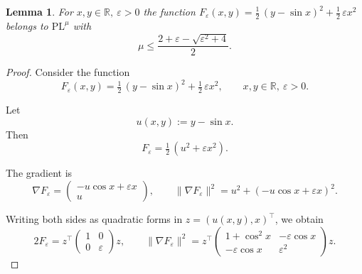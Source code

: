 \documentclass{article}
\def\R{{\mathbb{R}}}
\def\pl{{\text{PL}^\mu}}
\theoremstyle{plain}
\newtheorem{lemma}[theorem]{Lemma}
\theoremstyle{definition}
\theoremstyle{remark}
\begin{document}
\begin{lemma}\label{lem:toy_example_pl}
    For $x,y\in\R,\ \varepsilon>0$ the function $F_{\varepsilon}(x,y)=\tfrac12\,(y-\sin x)^2+\tfrac12\,\varepsilon x^2$ belongs to $\pl$ with
  $$\mu \le \frac{2+\varepsilon
-\sqrt{\varepsilon^2+4}}{2}.$$

\end{lemma}
\begin{proof}
    Consider the function
\[
F_{\varepsilon}(x,y)=\tfrac12\,(y-\sin x)^2+\tfrac12\,\varepsilon x^2,
\qquad x,y\in\R,\ \varepsilon>0.
\]

Let
\[
u(x,y) := y - \sin x.
\]
Then
\[
F_{\varepsilon}=\tfrac12\,(u^2+\varepsilon x^2).
\]

The gradient is
\[
\nabla F_{\varepsilon}=
\begin{pmatrix}
-u\cos x + \varepsilon x\\[3pt]
u
\end{pmatrix},
\qquad
\|\nabla F_{\varepsilon}\|^2 = u^2 + (-u\cos x + \varepsilon x)^2.
\]


Writing both sides as quadratic forms in \(z=(u(x,y),x)^\top\), we obtain
\[
2F_{\varepsilon}
= z^\top 
\begin{pmatrix}
1 & 0\\[3pt]
0 & \varepsilon
\end{pmatrix}z,
\qquad
\|\nabla F_{\varepsilon}\|^2
= z^\top
\begin{pmatrix}
1+\cos^2 x & -\varepsilon\cos x\\[3pt]
-\varepsilon\cos x & \varepsilon^2
\end{pmatrix}z.
\]


\end{proof}
\end{document}

